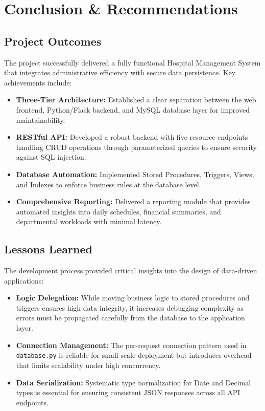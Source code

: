 \section{Conclusion \& Recommendations}

\subsection{Project Outcomes}

The project successfully delivered a fully functional Hospital Management System that integrates administrative efficiency with secure data persistence. Key achievements include:
\begin{itemize}
    \item \textbf{Three-Tier Architecture:} Established a clear separation between the web frontend, Python/Flask backend, and MySQL database layer for improved maintainability.
    \item \textbf{RESTful API:} Developed a robust backend with five resource endpoints handling CRUD operations through parameterized queries to ensure security against SQL injection.
    \item \textbf{Database Automation:} Implemented Stored Procedures, Triggers, Views, and Indexes to enforce business rules at the database level.
    \item \textbf{Comprehensive Reporting:} Delivered a reporting module that provides automated insights into daily schedules, financial summaries, and departmental workloads with minimal latency.
\end{itemize}

\subsection{Lessons Learned}

The development process provided critical insights into the design of data-driven applications:
\begin{itemize}
    \item \textbf{Logic Delegation:} While moving business logic to stored procedures and triggers ensures high data integrity, it increases debugging complexity as errors must be propagated carefully from the database to the application layer.
    \item \textbf{Connection Management:} The per-request connection pattern used in \texttt{database.py} is reliable for small-scale deployment but introduces overhead that limits scalability under high concurrency.
    \item \textbf{Data Serialization:} Systematic type normalization for Date and Decimal types is essential for ensuring consistent JSON responses across all API endpoints.
\end{itemize}

